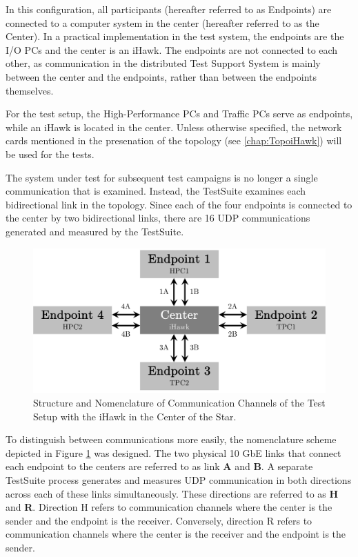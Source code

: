 In this configuration, all participants (hereafter referred to as Endpoints) are connected to a computer system in the center (hereafter referred to as the Center). In a practical implementation in the test system, the endpoints are the I/O PCs and the center is an iHawk. The endpoints are not connected to each other, as communication in the distributed Test Support System is mainly between the center and the endpoints, rather than between the endpoints themselves.

For the test setup, the High-Performance PCs and Traffic PCs serve as endpoints, while an iHawk is located in the center. Unless otherwise specified, the network cards mentioned in the presenation of the topology (see \ref{chap:TopoiHawk}) will be used for the tests.

The system under test for subsequent test campaigns is no longer a single communication that is examined. Instead, the TestSuite examines each bidirectional link in the topology. Since each of the four endpoints is connected to the center by two bidirectional links, there are 16 UDP communications generated and measured by the TestSuite.

\begin{figure}[h!]
    \centering
    \includegraphics[width=0.8\linewidth]{figures/reliability/ihawk/topo.pdf}
    \caption{Structure and Nomenclature of Communication Channels of the Test Setup with the iHawk in the Center of the Star.}
    \label{fig:topoihawknaming}
\end{figure}

To distinguish between communications more easily, the nomenclature scheme depicted in Figure \ref{fig:topoihawknaming} was designed. The two physical 10 GbE links that connect each endpoint to the centers are referred to as link \textbf{A} and \textbf{B}. A separate TestSuite process generates and measures UDP communication in both directions across each of these links simultaneously. These directions are referred to as \textbf{H} and \textbf{R}. Direction H refers to communication channels where the center is the sender and the endpoint is the receiver. Conversely, direction R refers to communication channels where the center is the receiver and the endpoint is the sender.

